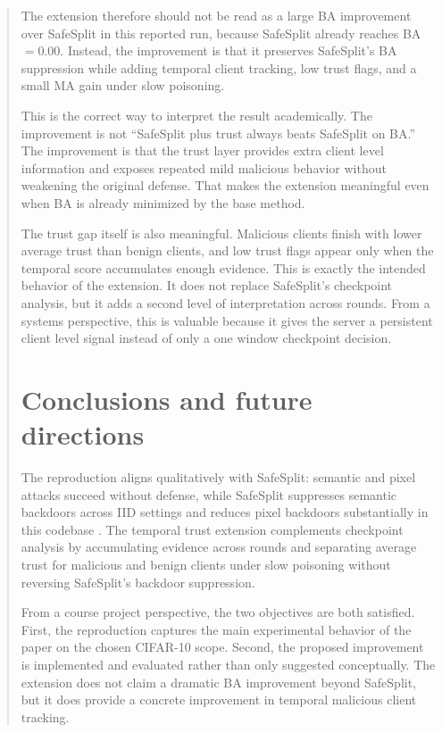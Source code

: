 \documentclass{article}
\begin{document}
\begin{abstract}
The extension therefore should not be read as a large BA improvement over SafeSplit in this reported run, because SafeSplit already reaches BA $=0.00$. Instead, the improvement is that it preserves SafeSplit's BA suppression while adding temporal client tracking, low trust flags, and a small MA gain under slow poisoning.

This is the correct way to interpret the result academically. The improvement is not ``SafeSplit plus trust always beats SafeSplit on BA.'' The improvement is that the trust layer provides extra client level information and exposes repeated mild malicious behavior without weakening the original defense. That makes the extension meaningful even when BA is already minimized by the base method.

The trust gap itself is also meaningful. Malicious clients finish with lower average trust than benign clients, and low trust flags appear only when the temporal score accumulates enough evidence. This is exactly the intended behavior of the extension. It does not replace SafeSplit's checkpoint analysis, but it adds a second level of interpretation across rounds. From a systems perspective, this is valuable because it gives the server a persistent client level signal instead of only a one window checkpoint decision.

\section{Conclusions and future directions}
\label{sec:conclusion}

The reproduction aligns qualitatively with SafeSplit: semantic and pixel attacks succeed without defense, while SafeSplit suppresses semantic backdoors across IID settings and reduces pixel backdoors substantially in this codebase \cite{safesplit2025}. The temporal trust extension complements checkpoint analysis by accumulating evidence across rounds and separating average trust for malicious and benign clients under slow poisoning without reversing SafeSplit's backdoor suppression.

From a course project perspective, the two objectives are both satisfied. First, the reproduction captures the main experimental behavior of the paper on the chosen CIFAR-10 scope. Second, the proposed improvement is implemented and evaluated rather than only suggested conceptually. The extension does not claim a dramatic BA improvement beyond SafeSplit, but it does provide a concrete improvement in temporal malicious client tracking.


\end{abstract}
\end{document}
